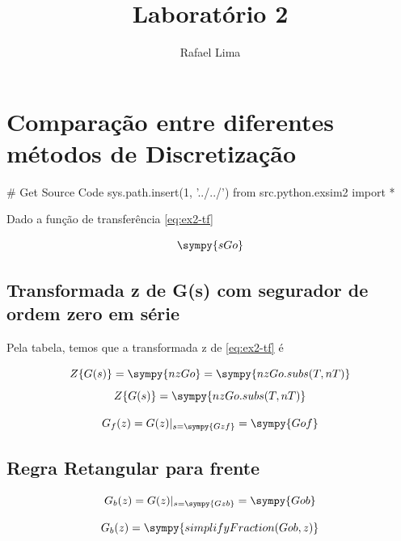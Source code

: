 \documentclass[a4paper,11pt]{article}
\title{Laboratório 2} %
\author{Rafael Lima}
\begin{document}

\section{Comparação entre diferentes métodos de Discretização}

\begin{sympycode}
# Get Source Code
sys.path.insert(1, '../../')
from src.python.exsim2 import *
\end{sympycode}

Dado a função de transferência \ref{eq:ex2-tf}

\begin{equation}\label{eq:ex2-tf}
\sympy{sGo}
\end{equation}

\subsection{Transformada z de G(s) com segurador de ordem zero em série}

Pela tabela, temos que a transformada z de \ref{eq:ex2-tf} é

$$Z\{G(s)\} = \sympy{nzGo} = \sympy{nzGo.subs(T,nT)}$$
$$Z\{G(s)\} = \sympy{nzGo.subs(T,nT)}$$


\begin{equation}
  G_f(z) =  G(z)|_{s = \sympy{Gzf}} = \sympy{Gof}
\end{equation}

\subsection{Regra Retangular para frente}

$$
G_b(z) =  G(z)|_{s = \sympy{Gzb}} = \sympy{Gob}
$$

\begin{equation}
    G_b(z) = \sympy{simplifyFraction(Gob,z)}
\end{equation}
\end{document}
